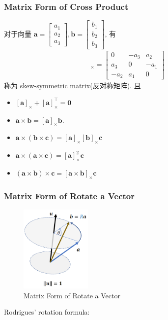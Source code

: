 \subsubsection{Matrix Form of Cross Product}\label{subsub:Matrix Form of Cross Product}
对于向量 $\bm a=\begin{bmatrix}
    a_1\\ a_2\\ a_3
\end{bmatrix}, \bm b=\begin{bmatrix}
    b_1\\ b_2\\ b_3
\end{bmatrix}$, 有
\begin{align*}
    [\bm a]_{\times} = \begin{bmatrix}
        0 & - a_3 & a_2 \\
        a_3 & 0  & -a_1 \\
        -a_2 & a_1 & 0
    \end{bmatrix}
\end{align*}
称为 skew-symmetric matrix(反对称矩阵). 且 
\begin{itemize}
    \item $[\bm a]_{\times}+ [\bm a]_{\times}^\top = \bm 0$
    \item $\bm a \times \bm b = [\bm a ]_{\times } \bm b$.
    \item $\bm a \times(\bm b \times \bm c)=[\bm a ]_\times [\bm b]_{\times}\bm c$
    \item $\bm a \times(\bm a \times \bm c)=[\bm a ]_\times^2\bm c$
    \item $(\bm a\times \bm b)\times \bm c = [\bm a \times \bm b]_\times \bm c$
\end{itemize}

\subsubsection{Matrix Form of Rotate a Vector}

\begin{figure}[!htb]
    \centering
    \includegraphics[width=0.309\textwidth]{pic/1052/Matrix Form of Rotate a Vector}
    \caption{Matrix Form of Rotate a Vector}
\end{figure}
Rodrigues' rotation formula:

